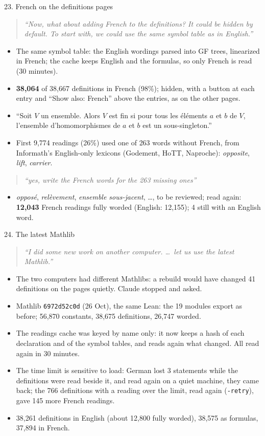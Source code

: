 \documentclass[10pt,aspectratio=169]{beamer}
\newcommand{\bad}[1]{\textcolor{warn}{#1}}
\newcommand{\ok}[1]{\textcolor{good}{#1}}
\newcommand{\commit}[1]{\texttt{\footnotesize #1}}
\newcommand{\prompt}[1]{\begin{quote}\small\itshape ``#1''\end{quote}}
\begin{document}
\begin{frame}{23. French on the definitions pages}
  \footnotesize
  \prompt{Now, what about adding French to the definitions? It could be hidden by default. To
  start with, we could use the same symbol table as in English.}
  \begin{itemize}
    \item The same symbol table: the English wordings parsed into GF trees, linearized in French;
          the cache keeps English and the formulas, so only French is read (30 minutes).
    \item \textbf{38,064} of 38,667 definitions in French (98\%); hidden, with a button at
          each entry and ``Show also: French'' above the entries, as on the other pages.
    \item ``Soit $V$ un ensemble. Alors $V$ est \bad{fin} si pour tous les éléments $a$ et $b$ de
          $V$, l'ensemble d'homomorphismes de $a$ et $b$ est un sous-singleton.''
    \item First 9,774 readings (26\%) used one of \bad{263 words without French}, from
          Informath's English-only lexicons (Godement, HoTT, Naproche): \emph{opposite},
          \emph{lift}, \emph{carrier}.
  \end{itemize}
  \prompt{yes, write the French words for the 263 missing ones}
  \begin{itemize}
    \item \ok{\emph{opposé}, \emph{relèvement}, \emph{ensemble sous-jacent}}, \dots, to be
          reviewed; read again: \textbf{12,043} French readings fully worded (English: 12,155);
          4 still with an English word.
  \end{itemize}
\end{frame}

\begin{frame}{24. The latest Mathlib}
  \small
  \prompt{I did some new work on another computer. \dots\ let us use the latest Mathlib.}
  \begin{itemize}
    \item The two computers had different Mathlibs: a rebuild would have changed 41
          definitions on the pages quietly. Claude stopped and asked.
    \item Mathlib \commit{6972d52c0d} (26 Oct), the same Lean: the 19 modules export as
          before; 56,870 constants, 38,675 definitions, 26,747 worded.
    \item The readings cache was keyed by name only: it now keeps a hash of each declaration
          and of the symbol tables, and reads again what changed. All read again in 30 minutes.
    \item The time limit is sensitive to load: German lost 3 statements while the definitions
          were read beside it, and read again on a quiet machine, they came back; the 766
          definitions with a reading over the limit, read again (\texttt{-retry}), gave 145 more
          French readings.
    \item 38,261 definitions in English (about 12,800 fully worded), 38,575 as formulas, 37,894
          in French.
  \end{itemize}
\end{frame}
\end{document}
